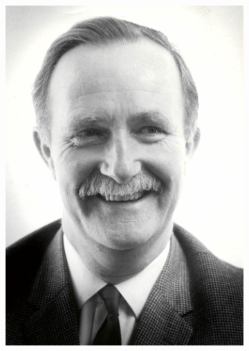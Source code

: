 \begin{refsection}
\begin{figure}[t]
\centering
\begin{subfigure}[t]{0.4\textwidth}
\includegraphics[width=1\textwidth,center]{artwork/chapter2/davidson-portrait.jpeg}
\end{subfigure}
\hfill
\begin{subfigure}[t]{0.57\textwidth}

\end{subfigure}
\end{figure}
\end{refsection}

